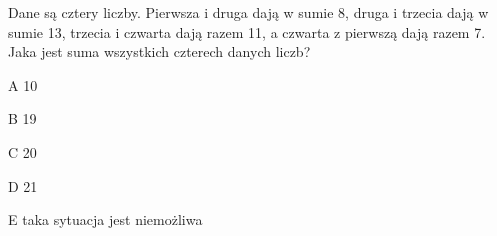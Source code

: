 \begin{tresc}
Dane są cztery liczby. Pierwsza i druga dają w sumie 8, druga i trzecia dają w sumie 13, trzecia i czwarta dają razem 11, a czwarta z pierwszą dają razem 7. Jaka jest suma wszystkich czterech danych liczb?
\end{tresc}
\begin{wariant}{A} 10 \end{wariant}
\begin{wariant}{B} 19 \end{wariant}
\begin{wariant}{C} 20 \end{wariant}
\begin{wariant}{D} 21 \end{wariant}
\begin{wariant}{E} taka sytuacja jest niemożliwa \end{wariant}
